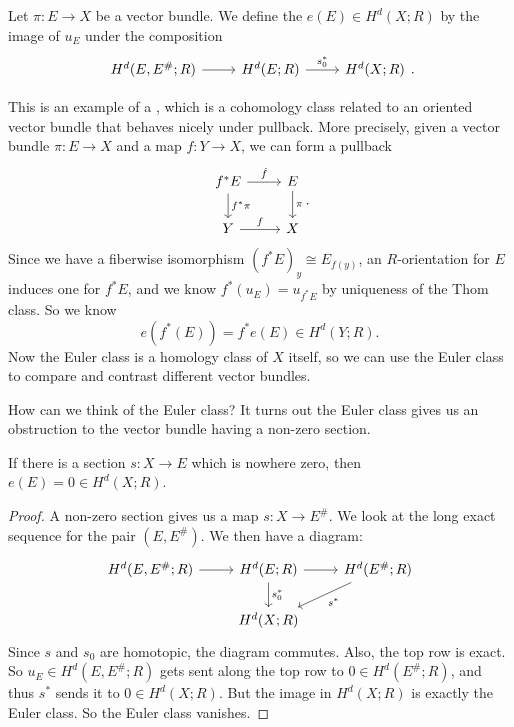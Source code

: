 \documentclass[a4paper]{article}
\begin{document}
\begin{defi}
  Let $\pi: E \to X$ be a vector bundle. We define the  $e(E) \in H^d(X; R)$ by the image of $u_E$ under the composition
  \[
    \begin{tikzcd}
      H^d(E, E^\#; R) \ar[r] & H^d(E; R) \ar[r, "s_0^*"] & H^d(X; R)
    \end{tikzcd}.
  \]
\end{defi}
This is an example of a , which is a cohomology class related to an oriented vector bundle that behaves nicely under pullback. More precisely, given a vector bundle $\pi: E \to X$ and a map $f: Y \to X$, we can form a pullback
\[
  \begin{tikzcd}
    f^*E \ar[r, "\hat{f}"] \ar[d, "f^*\pi"] & E \ar[d, "\pi"]\\
    Y \ar[r, "f"] & X
  \end{tikzcd}.
\]
Since we have a fiberwise isomorphism $(f^*E)_y \cong E_{f(y)}$, an $R$-orientation for $E$ induces one for $f^* E$, and we know $f^*(u_E) = u_{f^* E}$ by uniqueness of the Thom class. So we know
\[
  e(f^*(E)) = f^* e(E) \in H^d(Y; R).
\]
Now the Euler class is a homology class of $X$ itself, so we can use the Euler class to compare and contrast different vector bundles.

How can we think of the Euler class? It turns out the Euler class gives us an obstruction to the vector bundle having a non-zero section.
\begin{thm}
  If there is a section $s: X \to E$ which is nowhere zero, then $e(E) = 0 \in H^d(X; R)$.
\end{thm}

\begin{proof}
  A non-zero section gives us a map $s: X \to E^\#$. We look at the long exact sequence for the pair $(E, E^\#)$. We then have a diagram:
  \[
    \begin{tikzcd}
      H^d(E, E^\#; R) \ar[r] & H^d(E; R) \ar[r] \ar[d, "s_0^*"] & H^d(E^\#; R) \ar[dl, "s^*"]\\
      & H^d(X; R)
    \end{tikzcd}
  \]
  Since $s$ and $s_0$ are homotopic, the diagram commutes. Also, the top row is exact. So $u_E \in H^d(E, E^\#; R)$ gets sent along the top row to $0 \in H^d(E^\#; R)$, and thus $s^*$ sends it to $0 \in H^d(X; R)$. But the image in $H^d(X; R)$ is exactly the Euler class. So the Euler class vanishes.
\end{proof}
\end{document}

